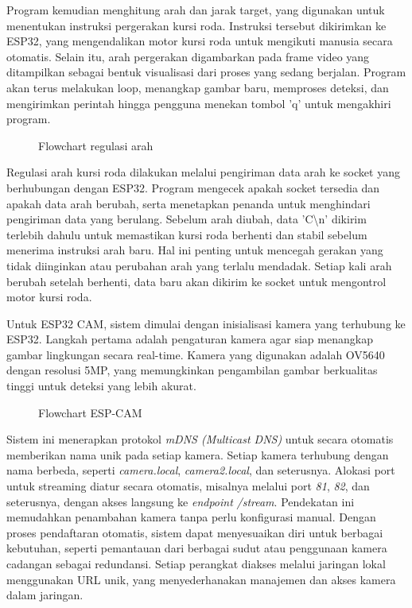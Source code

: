 Program kemudian menghitung arah dan jarak target, yang digunakan untuk menentukan instruksi pergerakan kursi roda. Instruksi tersebut dikirimkan ke ESP32, yang mengendalikan motor kursi roda untuk mengikuti manusia secara otomatis. Selain itu, arah pergerakan digambarkan pada frame video yang ditampilkan sebagai bentuk visualisasi dari proses yang sedang berjalan. Program akan terus melakukan loop, menangkap gambar baru, memproses deteksi, dan mengirimkan perintah hingga pengguna menekan tombol 'q' untuk mengakhiri program.


\begin{figure}[H]
  \centering
  \resizebox{.7\linewidth}{!}{
    
  }
  \caption{Flowchart regulasi arah}
\end{figure}

Regulasi arah kursi roda dilakukan melalui pengiriman data arah ke socket yang berhubungan dengan ESP32. Program mengecek apakah socket tersedia dan apakah data arah berubah, serta menetapkan penanda untuk menghindari pengiriman data yang berulang. Sebelum arah diubah, data 'C\textbackslash n' dikirim terlebih dahulu untuk memastikan kursi roda berhenti dan stabil sebelum menerima instruksi arah baru. Hal ini penting untuk mencegah gerakan yang tidak diinginkan atau perubahan arah yang terlalu mendadak. Setiap kali arah berubah setelah berhenti, data baru akan dikirim ke socket untuk mengontrol motor kursi roda.

Untuk ESP32 CAM, sistem dimulai dengan inisialisasi kamera yang terhubung ke ESP32. Langkah pertama adalah pengaturan kamera agar siap menangkap gambar lingkungan secara real-time. Kamera yang digunakan adalah OV5640 dengan resolusi 5MP, yang memungkinkan pengambilan gambar berkualitas tinggi untuk deteksi yang lebih akurat.

\begin{figure}[H]
  \centering
  \resizebox{.7\linewidth}{!}{
    
  }
  \caption{Flowchart ESP-CAM}
\end{figure}

Sistem ini menerapkan protokol \emph{mDNS (Multicast DNS)} untuk secara otomatis memberikan nama unik pada setiap kamera. Setiap kamera terhubung dengan nama berbeda, seperti \emph{camera.local}, \emph{camera2.local}, dan seterusnya. Alokasi port untuk streaming diatur secara otomatis, misalnya melalui port \emph{81}, \emph{82}, dan seterusnya, dengan akses langsung ke \emph{endpoint} \emph{/stream}. Pendekatan ini memudahkan penambahan kamera tanpa perlu konfigurasi manual. Dengan proses pendaftaran otomatis, sistem dapat menyesuaikan diri untuk berbagai kebutuhan, seperti pemantauan dari berbagai sudut atau penggunaan kamera cadangan sebagai redundansi. Setiap perangkat diakses melalui jaringan lokal menggunakan URL unik, yang menyederhanakan manajemen dan akses kamera dalam jaringan.

